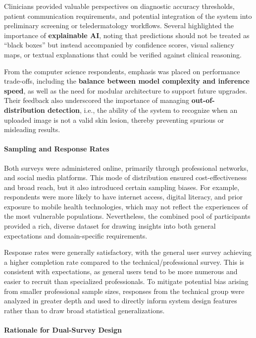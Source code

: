 \documentclass[
  12pt,
  oneside]{article}
\begin{document}
Clinicians provided valuable perspectives on diagnostic accuracy
thresholds, patient communication requirements, and potential
integration of the system into preliminary screening or teledermatology
workflows. Several highlighted the importance of \textbf{explainable
AI}, noting that predictions should not be treated as ``black boxes''
but instead accompanied by confidence scores, visual saliency maps, or
textual explanations that could be verified against clinical reasoning.

From the computer science respondents, emphasis was placed on
performance trade-offs, including the \textbf{balance between model
complexity and inference speed}, as well as the need for modular
architecture to support future upgrades. Their feedback also underscored
the importance of managing \textbf{out-of-distribution detection}, i.e.,
the ability of the system to recognize when an uploaded image is not a
valid skin lesion, thereby preventing spurious or misleading results.

\paragraph{Sampling and Response
Rates}\label{sampling-and-response-rates}

Both surveys were administered online, primarily through professional
networks, and social media platforms. This mode of distribution ensured
cost-effectiveness and broad reach, but it also introduced certain
sampling biases. For example, respondents were more likely to have
internet access, digital literacy, and prior exposure to mobile health
technologies, which may not reflect the experiences of the most
vulnerable populations. Nevertheless, the combined pool of participants
provided a rich, diverse dataset for drawing insights into both general
expectations and domain-specific requirements.

Response rates were generally satisfactory, with the general user survey
achieving a higher completion rate compared to the
technical/professional survey. This is consistent with expectations, as
general users tend to be more numerous and easier to recruit than
specialized professionals. To mitigate potential bias arising from
smaller professional sample sizes, responses from the technical group
were analyzed in greater depth and used to directly inform system design
features rather than to draw broad statistical generalizations.

\paragraph{Rationale for Dual-Survey
Design}\label{rationale-for-dual-survey-design}
\end{document}
